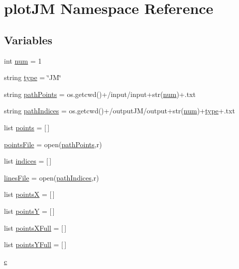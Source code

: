 \hypertarget{namespaceplotJM}{}\section{plot\+JM Namespace Reference}
\label{namespaceplotJM}
\subsection*{Variables}
\begin{DoxyCompactItemize}
\item 
int \hyperlink{namespaceplotJM_aa893f2c8f47574915a4cc130164ba160}{num} = 1
\item 
string \hyperlink{namespaceplotJM_aece5bd26b7eba5b9cc746654691880c0}{type} = \char`\"{}JM\char`\"{}
\item 
string \hyperlink{namespaceplotJM_a7e306c9d020e3a82daec94c8a7981b5e}{path\+Points} = os.\+getcwd()+\textquotesingle{}/input/input\textquotesingle{}+str(\hyperlink{namespaceplotJM_aa893f2c8f47574915a4cc130164ba160}{num})+\textquotesingle{}.txt\textquotesingle{}
\item 
string \hyperlink{namespaceplotJM_acd0ae8ec083c4b2359bb23875bb4792c}{path\+Indices} = os.\+getcwd()+\textquotesingle{}/output\+JM/output\textquotesingle{}+str(\hyperlink{namespaceplotJM_aa893f2c8f47574915a4cc130164ba160}{num})+\hyperlink{namespaceplotJM_aece5bd26b7eba5b9cc746654691880c0}{type}+\textquotesingle{}.txt\textquotesingle{}
\item 
list \hyperlink{namespaceplotJM_a4736c91f6642a68255bc59e25177f6b6}{points} = \mbox{[}$\,$\mbox{]}
\item 
\hyperlink{namespaceplotJM_a1981504f48dad7742cddc6613eb4819f}{points\+File} = open(\hyperlink{namespaceplotJM_a7e306c9d020e3a82daec94c8a7981b5e}{path\+Points},\textquotesingle{}r\textquotesingle{})
\item 
list \hyperlink{namespaceplotJM_ac8a0cf53bb644724563a7855b2f1298f}{indices} = \mbox{[}$\,$\mbox{]}
\item 
\hyperlink{namespaceplotJM_a5d87970cd85b2ed2de29d310a2c11739}{lines\+File} = open(\hyperlink{namespaceplotJM_acd0ae8ec083c4b2359bb23875bb4792c}{path\+Indices},\textquotesingle{}r\textquotesingle{})
\item 
list \hyperlink{namespaceplotJM_adf22560b07746c190ca82c2067a72af5}{pointsX} = \mbox{[}$\,$\mbox{]}
\item 
list \hyperlink{namespaceplotJM_af0fe4115db67f777b24566dca7ae1d83}{pointsY} = \mbox{[}$\,$\mbox{]}
\item 
list \hyperlink{namespaceplotJM_a6269675659677b5b402dd2e97fb3d9f6}{points\+X\+Full} = \mbox{[}$\,$\mbox{]}
\item 
list \hyperlink{namespaceplotJM_a94cf66896dacc6cbe356a810745e72ff}{points\+Y\+Full} = \mbox{[}$\,$\mbox{]}
\item 
\hyperlink{namespaceplotJM_a3eca2b92173774b6200493c52c64dec4}{c}
\end{DoxyCompactItemize}


